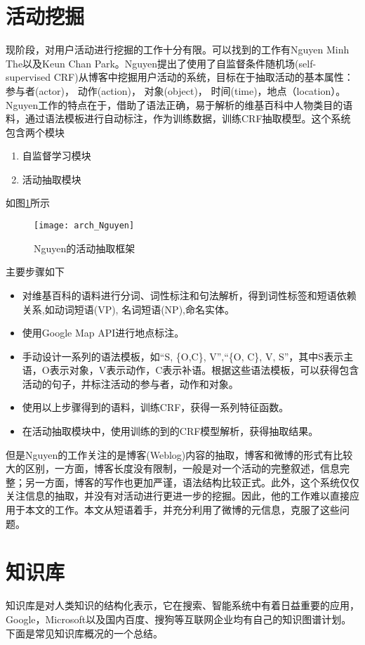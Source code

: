 \section{活动挖掘}
现阶段，对用户活动进行挖掘的工作十分有限。可以找到的工作有Nguyen Minh The以及Keun Chan Park\cite{park2010detecting}。Nguyen\cite{the2010automatic}\cite{kawamura2010human}提出了使用了自监督条件随机场(self-supervised CRF)从博客中挖掘用户活动的系统，目标在于抽取活动的基本属性：参与者(actor)， 动作(action)， 对象(object)， 时间(time)，地点（location）。Nguyen工作的特点在于，借助了语法正确，易于解析的维基百科中人物类目的语料，通过语法模板进行自动标注，作为训练数据，训练CRF抽取模型。这个系统包含两个模块
\begin{enumerate}
\item 自监督学习模块
\item 活动抽取模块
\end{enumerate}
如图\ref{fig:nguyen_frameword}所示
\begin{figure}[!h]
\centering
\texttt{[image: arch\_Nguyen]}
\caption{Nguyen的活动抽取框架}
\label{fig:nguyen_frameword}
\end{figure}

主要步骤如下
\begin{itemize}
\item 对维基百科的语料进行分词、词性标注和句法解析，得到词性标签和短语依赖关系,如动词短语(VP), 名词短语(NP),命名实体。
\item 使用Google Map API进行地点标注。
\item 手动设计一系列的语法模板，如``S, \{O,C\}, V'',``\{O, C\}, V, S''，其中S表示主语，O表示对象，V表示动作，C表示补语。根据这些语法模板，可以获得包含活动的句子，并标注活动的参与者，动作和对象。
\item 使用以上步骤得到的语料，训练CRF，获得一系列特征函数。
\item 在活动抽取模块中，使用训练的到的CRF模型解析，获得抽取结果。
\end{itemize}

但是Nguyen的工作关注的是博客(Weblog)内容的抽取，博客和微博的形式有比较大的区别，一方面，博客长度没有限制，一般是对一个活动的完整叙述，信息完整；另一方面，博客的写作也更加严谨，语法结构比较正式。此外，这个系统仅仅关注信息的抽取，并没有对活动进行更进一步的挖掘。因此，他的工作难以直接应用于本文的工作。本文从短语着手，并充分利用了微博的元信息，克服了这些问题。

\section{知识库}
知识库是对人类知识的结构化表示，它在搜索、智能系统中有着日益重要的应用，Google，Microsoft以及国内百度、搜狗等互联网企业均有自己的知识图谱计划。下面是常见知识库概况的一个总结。

